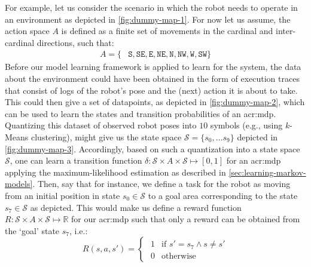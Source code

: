 For example, let us consider the scenario in which the robot needs to operate in an environment as depicted in \autoref{fig:dummy-map-1}.
For now let us assume, the action space $A$ is defined as a finite set of movements in the cardinal and inter-cardinal directions, such that: 
\begin{align*}
	A = \{&\texttt{S}, \texttt{SE}, \texttt{E}, \texttt{NE},
		  \texttt{N}, \texttt{NW}, \texttt{W}, \texttt{SW}  \}
\end{align*}\newpage
Before our model learning framework is applied to learn  for the system, the data about the environment could have been obtained in the form of execution traces that consist of logs of the robot's pose and the (next) action it is about to take.
This could then give a set of datapoints, as depicted in \autoref{fig:dummy-map-2}, which can be used to learn the states and transition probabilities of an \acrshort{acr:mdp}.
Quantizing this dataset of observed robot poses into $10$ symbols (e.g., using $k$-Means clustering), might give us the state space $\mathcal{S} = \{s_0, \ldots s_9\}$ depicted in \autoref{fig:dummy-map-3}.
Accordingly, based on such a quantization into a state space $\mathcal{S}$, one can learn a transition function $\delta: \mathcal{S} \times A \times \mathcal{S} \mapsto [0, 1]$ for an \acrshort{acr:mdp} applying the maximum-likelihood estimation as described in \autoref{sec:learning-markov-models}.
Then, say that for instance, we define a task for the robot as moving from an initial position in state $s_0 \in \mathcal{S}$ to a goal area corresponding to the state $s_7 \in \mathcal{S}$ as depicted.
This would make us define a reward function $R: \mathcal{S} \times A \times \mathcal{S} \mapsto \mathbb{R}$ for our \acrshort{acr:mdp} such that only a reward can be obtained from the `goal' state $s_7$, i.e.:
\[
R(s, a, s') = 
\begin{cases}
\hspace{4pt} 	1 & \text{if } s' = s_7 \land s \neq s'\\
\hspace{4pt} 	0 & \text{otherwise}
\end{cases}
\]

